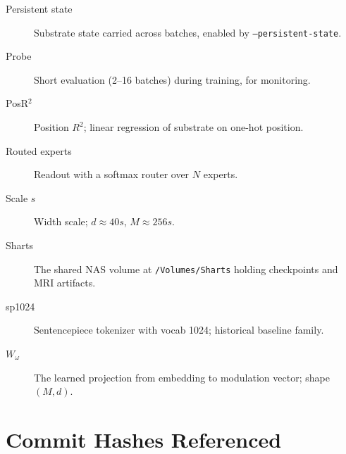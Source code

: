 \documentclass[11pt,openany]{book}
\theoremstyle{definition}
\theoremstyle{plain}
\newcommand{\omegaproj}{W_\omega}
\begin{document}
\begin{description}
  \item[Persistent state] Substrate state carried across batches,
    enabled by \texttt{--persistent-state}.
  \item[Probe] Short evaluation (2--16 batches) during training, for
    monitoring.
  \item[PosR$^2$] Position $R^2$; linear regression of substrate on
    one-hot position.
  \item[Routed experts] Readout with a softmax router over $N$ experts.
  \item[Scale $s$] Width scale; $d \approx 40 s$, $M \approx 256 s$.
  \item[Sharts] The shared NAS volume at \texttt{/Volumes/Sharts}
    holding checkpoints and MRI artifacts.
  \item[sp1024] Sentencepiece tokenizer with vocab 1024; historical
    baseline family.
  \item[$\omegaproj$] The learned projection from embedding to
    modulation vector; shape $(M, d)$.
\end{description}

\chapter{Commit Hashes Referenced}
\end{document}
